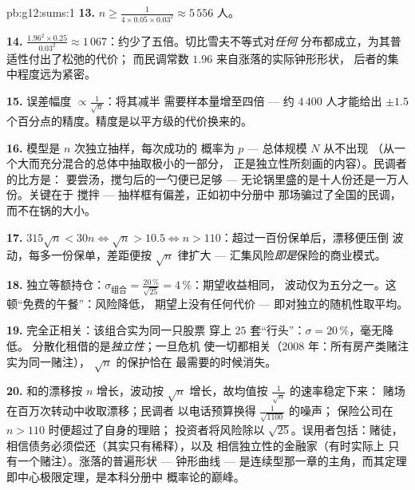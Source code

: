 \begin{solution}{pb:g12:sums:1}
\textbf{13.} $n \geq \frac{1}{4 \times 0.05 \times 0.03^2}
\approx 5\,556$ 人。

\textbf{14.} $\frac{1.96^2 \times 0.25}{0.03^2} \approx
1\,067$：约少了五倍。切比雪夫不等式对\emph{任何}
分布都成立，为其普适性付出了松弛的代价；
而民调常数 $1.96$ 来自涨落的实际钟形形状，
后者的集中程度远为紧密。

\textbf{15.} 误差幅度 $\propto \frac{1}{\sqrt n}$：将其减半
需要样本量增至四倍 --- 约 $4\,400$ 人才能给出
$\pm 1.5$ 个百分点的精度。精度是以平方级的代价换来的。

\textbf{16.} 模型是 $n$ 次独立抽样，每次成功的
概率为 $p$ --- 总体规模 $N$ 从不出现
（从一个大而充分混合的总体中抽取极小的一部分，
正是独立性所刻画的内容）。民调者的比方是：
要尝汤，搅匀后的一勺便已足够 ---
无论锅里盛的是十人份还是一万人份。关键在于
搅拌 --- 抽样框有偏差，正如初中分册中
那场骗过了全国的民调，而不在锅的大小。

\textbf{17.} $315\sqrt n < 30n \iff \sqrt n > 10.5 \iff
n > 110$：超过一百份保单后，漂移便压倒
波动，每多一份保单，差距便按
$\sqrt n$ 律扩大 --- 汇集风险\emph{即是}保险的商业模式。

\textbf{18.} 独立等额持仓：$\sigma_{\text{组合}} =
\frac{20\,\%}{\sqrt{25}} = 4\,\%$：期望收益相同，
波动仅为五分之一。这顿“免费的午餐”：风险降低，
期望上没有任何代价 --- 即对独立的随机性取平均。

\textbf{19.} 完全正相关：该组合实为同一只股票
穿上 $25$ 套“行头”：$\sigma = 20\,\%$，毫无降低。
分散化租借的是\emph{独立性}；一旦危机
使一切都相关（2008 年：所有房产类赌注实为同一赌注），
$\sqrt n$ 的保护恰在
最需要的时候消失。

\textbf{20.} 和的漂移按 $n$ 增长，波动按
$\sqrt n$ 增长，故均值按 $\frac{1}{\sqrt n}$ 的速率稳定下来：
赌场在百万次转动中收取漂移；民调者
以电话预算换得 $\frac{1}{\sqrt{1100}}$ 的噪声；
保险公司在 $n > 110$ 时便超过了自身的理赔；
投资者将风险除以 $\sqrt{25}$。误用者包括：赌徒，
相信债务必须偿还（其实只有稀释），以及
相信独立性的金融家（有时实际上
只有一个赌注）。涨落的普遍形状 ---
钟形曲线 --- 是连续型那一章的主角，而其定理
即中心极限定理，是本科分册中
概率论的巅峰。
\end{solution}

